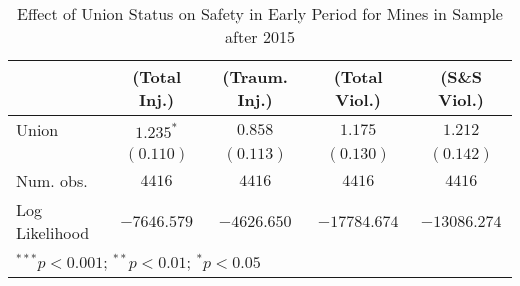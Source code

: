 
\begin{table}[H]
\begin{center}
\begin{tabular}{l c c c c}
\hline
 & (Total Inj.) & (Traum. Inj.) & (Total Viol.) & (S\&S Viol.) \\
\hline
Union          & $1.235^{*}$ & $0.858$     & $1.175$      & $1.212$      \\
               & $(0.110)$   & $(0.113)$   & $(0.130)$    & $(0.142)$    \\
\hline
Num. obs.      & $4416$      & $4416$      & $4416$       & $4416$       \\
Log Likelihood & $-7646.579$ & $-4626.650$ & $-17784.674$ & $-13086.274$ \\
\hline
\multicolumn{5}{l}{\scriptsize{$^{***}p<0.001$; $^{**}p<0.01$; $^{*}p<0.05$}}
\end{tabular}
\caption{Effect of Union Status on Safety in Early Period for Mines in Sample after 2015}
\label{irr_100employees_activelate}
\end{center}
\end{table}

